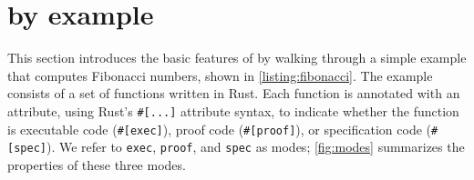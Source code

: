 

\section{\verus by example} \label{sec:design}

This section introduces the basic features of \verus
by walking through a simple example that computes Fibonacci numbers,
shown in \autoref{listing:fibonacci}.
The example consists of a set of functions written in Rust.
Each function is annotated with an attribute,
using Rust's \verb`#[...]` attribute syntax,
to indicate whether the function is executable code (\verb`#[exec]`),
proof code (\verb`#[proof]`),
or specification code (\verb`#[spec]`).
We refer to \verb`exec`, \verb`proof`, and \verb`spec` as modes;
\autoref{fig:modes} summarizes the properties of these three modes.

